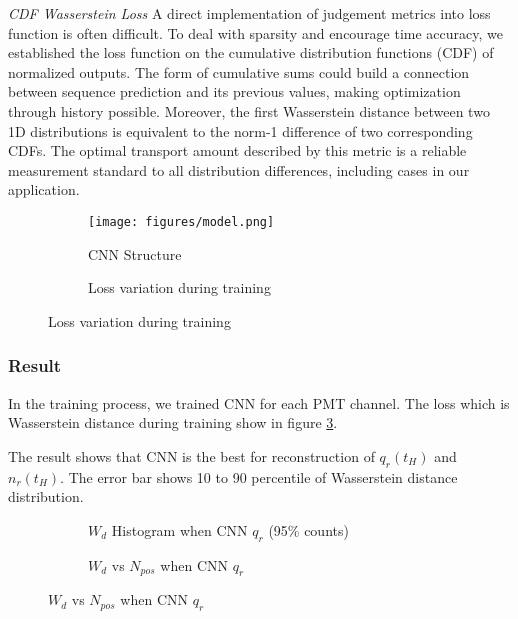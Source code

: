\emph{CDF Wasserstein Loss}
A direct implementation of judgement metrics into loss function is often difficult. To deal with sparsity and encourage time accuracy, we established the loss function on the cumulative distribution functions (CDF) of normalized outputs. The form of cumulative sums could build a connection between sequence prediction and its previous values, making optimization through history possible. Moreover, the first Wasserstein distance between two 1D distributions is equivalent to the norm-1 difference of two corresponding CDFs. The optimal transport amount described by this metric is a reliable measurement standard to all distribution differences, including cases in our application.

\begin{figure}[H]
\begin{minipage}[b]{.3\textwidth}
\begin{figure}[H]
    \centering
    \texttt{[image: figures/model.png]}
    \caption{\label{fig:struct} CNN Structure}
\end{figure}
\end{minipage}
\begin{minipage}[b]{.7\textwidth}
\begin{figure}[H]
    \centering
    \resizebox{0.7\textwidth}{!}{}
    \caption{\label{fig:loss} Loss variation during training}
\end{figure}
\end{minipage}
\end{figure}

\subsubsection{Result}
In the training process, we trained CNN for each PMT channel. The loss which is Wasserstein distance during training show in figure \ref{fig:loss}. 

The result shows that CNN is the best for reconstruction of $q_{r}(t_{H})$ and $n_{r}(t_{H})$. The error bar shows 10 to 90 percentile of Wasserstein distance distribution. 

\begin{figure}[H]
\begin{minipage}[b]{.5\textwidth}
\begin{figure}[H]
    \centering
    \resizebox{\textwidth}{!}{}
    \caption{$W_{d}$ Histogram when CNN $q_{r}$ (95\% counts)}
\end{figure}
\end{minipage}
\begin{minipage}[b]{.5\textwidth}
\begin{figure}[H]
    \centering
    \resizebox{\textwidth}{!}{}
    \caption{$W_{d}$ vs $N_{pos}$ when CNN $q_{r}$}
\end{figure}
\end{minipage}
\end{figure}

